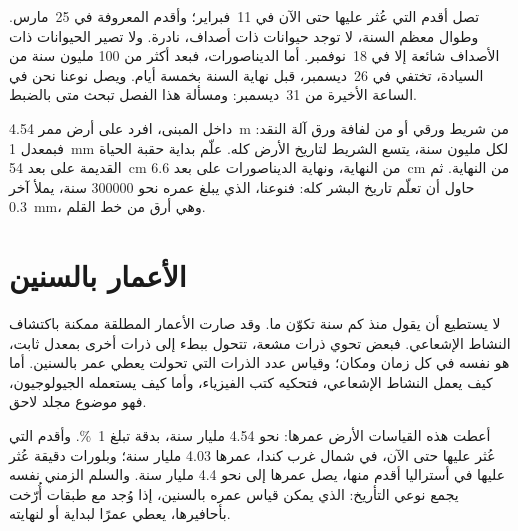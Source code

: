 تصل أقدم  التي عُثر عليها حتى الآن في 11~فبراير؛ وأقدم 
المعروفة في 25~مارس. وطوال معظم السنة، لا توجد حيوانات ذات أصداف، 
نادرة. ولا تصير الحيوانات ذات الأصداف شائعة إلا في 18~نوفمبر. أما
الديناصورات، فبعد أكثر من \num{100} مليون سنة من السيادة، تختفي في
26~ديسمبر، قبل نهاية السنة بخمسة أيام. ويصل نوعنا نحن في الساعة الأخيرة
من 31~ديسمبر: ومسألة هذا الفصل تبحث متى بالضبط.

\begin{inthelab}
داخل المبنى، افرد على أرض ممر \qty{4.54}{m} من شريط ورقي أو من لفافة ورق
آلة النقد: فبمعدل \qty{1}{mm} لكل مليون سنة، يتسع الشريط لتاريخ الأرض كله.
علّم بداية حقبة الحياة القديمة على بعد \qty{54}{cm} من النهاية، ونهاية
الديناصورات على بعد \qty{6.6}{cm} من النهاية. ثم حاول أن تعلّم تاريخ البشر
كله: فنوعنا، الذي يبلغ عمره نحو \num{300000} سنة، يملأ آخر \qty{0.3}{mm}،
وهي أرق من خط القلم.
\end{inthelab}

\section{الأعمار بالسنين}

لا يستطيع  أن يقول منذ كم سنة تكوّن  ما. وقد صارت الأعمار
المطلقة ممكنة باكتشاف النشاط الإشعاعي. فبعض  تحوي ذرات مشعة،
تتحول ببطء إلى ذرات أخرى بمعدل ثابت، هو نفسه في كل زمان ومكان؛ وقياس عدد
الذرات التي تحولت يعطي عمر  بالسنين. أما كيف يعمل النشاط الإشعاعي،
فتحكيه كتب الفيزياء، وأما كيف يستعمله الجيولوجيون، فهو موضوع مجلد
لاحق.

أعطت هذه القياسات الأرض عمرها: نحو \num{4.54} مليار سنة، بدقة تبلغ
1~\%. وأقدم  التي عُثر عليها حتى الآن، في شمال غرب كندا، عمرها
\num{4.03} مليار سنة؛ وبلورات دقيقة عُثر عليها في أستراليا أقدم منها،
يصل عمرها إلى نحو \num{4.4} مليار سنة. والسلم الزمني نفسه يجمع نوعي
التأريخ:  الذي يمكن قياس عمره بالسنين، إذا وُجد مع طبقات أُرّخت
بأحافيرها، يعطي عمرًا لبداية  أو لنهايته.

